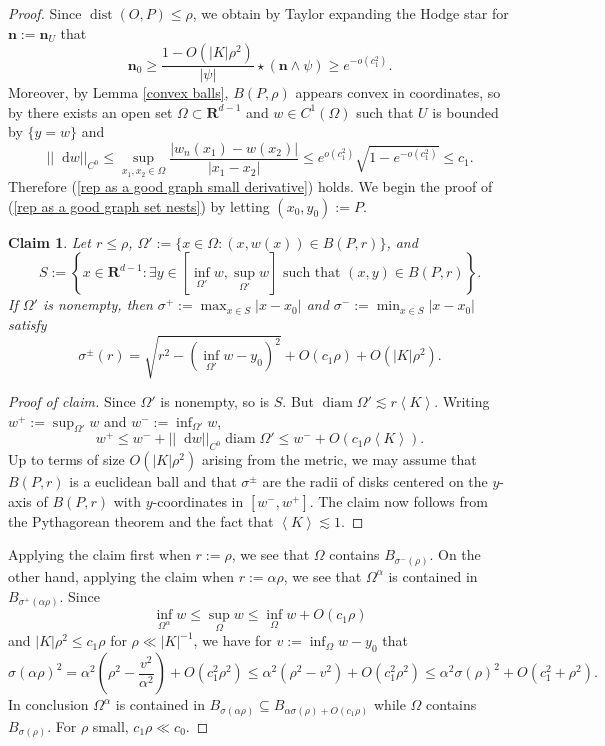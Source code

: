 \documentclass[reqno,10pt]{amsart}
\newcommand{\RR}{\mathbf{R}}
\DeclareMathOperator{\diam}{diam}
\newcommand*\dif{\mathop{}\!\mathrm{d}}
\DeclareMathOperator{\dist}{dist}
\newcommand{\normal}{\mathbf n}
\def\Japan#1{\left \langle #1 \right \rangle}
\newtheorem{claim}{Claim}[theorem]
\theoremstyle{definition}
\numberwithin{equation}{section}
\begin{document}
\begin{proof}
Since $\dist(O, P) \leq \rho$, we obtain by Taylor expanding the Hodge star for $\normal := \normal_U$ that 
$$\normal_0 \geq \frac{1 - O(|K|\rho^2)}{|\psi|} \star (\normal \wedge \psi) \geq e^{-o(c_1^2)}.$$
Moreover, by Lemma \ref{convex balls}, $B(P, \rho)$ appears convex in coordinates, so by \cite[Theorem 4.8]{Giusti77} there exists an open set $\Omega \subset \RR^{d - 1}$ and $w \in C^1(\Omega)$ such that $U$ is bounded by $\{y = w\}$ and
$$||\dif w||_{C^0} \leq \sup_{x_1, x_2 \in \Omega} \frac{|w_n(x_1) - w(x_2)|}{|x_1 - x_2|} \leq e^{o(c_1^2)}\sqrt{1 - e^{-o(c_1^2)}} \leq c_1.$$
Therefore (\ref{rep as a good graph small derivative}) holds.
We begin the proof of (\ref{rep as a good graph set nests}) by letting $(x_0, y_0) := P$.

\begin{claim}
Let $r \leq \rho$, $\Omega' := \{x \in \Omega: (x, w(x)) \in B(P, r)\}$, and
$$S := \left\{x \in \RR^{d - 1}: \exists y \in \left[\inf_{\Omega'} w, \sup_{\Omega'} w\right] \text{ such that } (x, y) \in B(P, r)\right\}.$$
If $\Omega'$ is nonempty, then $\sigma^+ := \max_{x \in S} |x - x_0|$ and $\sigma^- := \min_{x \in S} |x - x_0|$ satisfy 
$$\sigma^\pm(r) = \sqrt{r^2 - (\inf_{\Omega'} w - y_0)^2} + O(c_1  \rho) + O(|K| \rho^2).$$
\end{claim}
\begin{proof}[Proof of claim]
Since $\Omega'$ is nonempty, so is $S$. But $\diam \Omega' \lesssim r \Japan K$.
Writing $w^+ := \sup_{\Omega'} w$ and $w^- := \inf_{\Omega'} w$,
$$w^+ \leq w^- + ||\dif w||_{C^0} \diam \Omega' \leq w^- + O(c_1 \rho \Japan K).$$
Up to terms of size $O(|K| \rho^2)$ arising from the metric, we may assume that $B(P, r)$ is a euclidean ball and that $\sigma^\pm$ are the radii of disks centered on the $y$-axis of $B(P, r)$ with $y$-coordinates in $[w^-, w^+]$.
The claim now follows from the Pythagorean theorem and the fact that $\Japan K \lesssim 1$.
\end{proof}

Applying the claim first when $r := \rho$, we see that $\Omega$ contains $B_{\sigma^-(\rho)}$.
On the other hand, applying the claim when $r := \alpha \rho$, we see that $\Omega^\alpha$ is contained in $B_{\sigma^+(\alpha \rho)}$.
Since 
$$\inf_{\Omega^\alpha} w \leq \sup_\Omega w \leq \inf_\Omega w + O(c_1 \rho)$$
and $|K| \rho^2 \leq c_1 \rho$ for $\rho \ll |K|^{-1}$, we have for $v := \inf_\Omega w - y_0$ that
$$\sigma(\alpha \rho)^2 = \alpha^2\left(\rho^2 - \frac{v^2}{\alpha^2}\right) + O(c_1^2 \rho^2) \leq \alpha^2(\rho^2 - v^2) + O(c_1^2 \rho^2) \leq \alpha^2 \sigma(\rho)^2 + O(c_1^2 + \rho^2).$$
In conclusion $\Omega^\alpha$ is contained in $B_{\sigma(\alpha \rho)} \subseteq B_{\alpha \sigma(\rho) + O(c_1 \rho)}$ while $\Omega$ contains $B_{\sigma(\rho)}$.
For $\rho$ small, $c_1 \rho \ll c_0$.
\end{proof}
\end{document}
